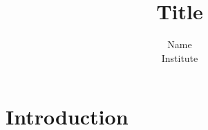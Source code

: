 \documentclass[11pt]{article}
\title{Title}
\author{
    Name\\
    Institute\\
    \email{email@email.com}
}
\date{}
\begin{document}
    \maketitle  

    \begin{abstract}

    \end{abstract}
    \newpage

    \section{Introduction}
    

    \newpage

    
 
\end{document}
